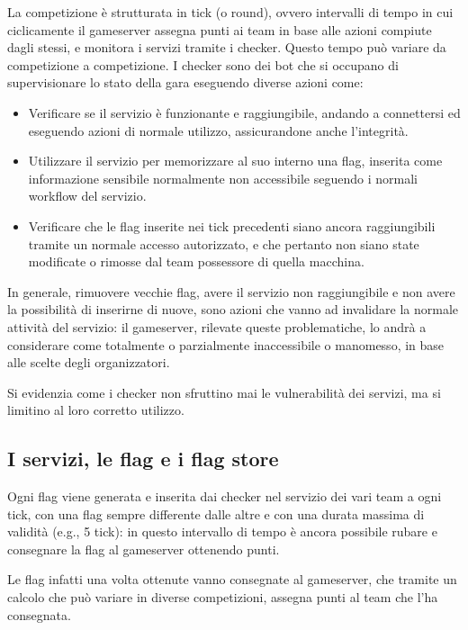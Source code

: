 La competizione è strutturata in tick (o round), ovvero intervalli di tempo in cui ciclicamente il gameserver assegna punti ai team in base alle azioni compiute dagli stessi, e monitora i servizi tramite i checker. Questo tempo può variare da competizione a competizione. I checker sono dei bot che si occupano di supervisionare lo stato della gara eseguendo diverse azioni come:
\begin{itemize}
    \setlength{\itemsep}{2pt}
    \setlength{\parskip}{2pt}
    \item Verificare se il servizio è funzionante e raggiungibile, andando a connettersi ed eseguendo azioni di normale utilizzo, assicurandone anche l'integrità.
    \item Utilizzare il servizio per memorizzare al suo interno una flag, inserita come informazione sensibile normalmente non accessibile seguendo i normali workflow del servizio.
    \item Verificare che le flag inserite nei tick precedenti siano ancora raggiungibili tramite un normale accesso autorizzato, e che pertanto non siano state modificate o rimosse dal team possessore di quella macchina.
\end{itemize}

In generale, rimuovere vecchie flag, avere il servizio non raggiungibile e non avere la possibilità di inserirne di nuove, sono azioni che vanno ad invalidare la normale attività del servizio: il gameserver, rilevate queste problematiche, lo andrà a considerare come totalmente o parzialmente inaccessibile o manomesso, in base alle scelte degli organizzatori.

Si evidenzia come i checker non sfruttino mai le vulnerabilità dei servizi, ma si limitino al loro corretto utilizzo.

\subsection{I servizi, le flag e i flag store}

Ogni flag viene generata e inserita dai checker nel servizio dei vari team a ogni tick, con una flag sempre differente dalle altre e con una durata massima di validità (e.g., 5 tick): in questo intervallo di tempo è ancora possibile rubare e consegnare la flag al gameserver ottenendo punti.

Le flag infatti una volta ottenute vanno consegnate al gameserver, che tramite un calcolo che può variare in diverse competizioni, assegna punti al team che l'ha consegnata.

